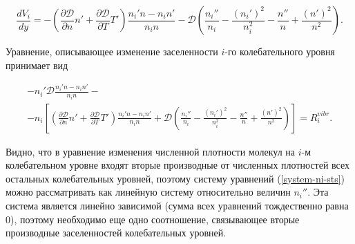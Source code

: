 \documentclass[12pt]{article}
\begin{document}
\begin{equation}
  \frac{dV_{i}}{dy} = -\left(\frac{\partial \mathcal{D}}{\partial n}n' + \frac{\partial \mathcal{D}}{\partial T}T' \right) \frac{n_{i}'n - n_{i}n'}{n_{i}n} - \mathcal{D}\left(\frac{n_{i}''}{n_{i}} - \frac{\left(n_{i}'\right)^2}{n_{i}^2} - \frac{n''}{n} + \frac{\left(n'\right)^2}{n^2} \right).
\end{equation}

Уравнение, описывающее изменение заселенности $i$-го колебательного уровня принимает вид

\begin{multline}
  -n_{i}' \mathcal{D} \frac{n_{i}'n - n_{i}n'}{n_{i}n} - \\  %
  - n_{i} \left[\left(\frac{\partial \mathcal{D}}{\partial n}n' + \frac{\partial \mathcal{D}}{\partial T}T' \right) \frac{n_{i}'n - n_{i}n'}{n_{i}n} + \mathcal{D}\left(\frac{n_{i}''}{n_{i}} - \frac{\left(n_{i}'\right)^2}{n_{i}^2} - \frac{n''}{n} + \frac{\left(n'\right)^2}{n^2} \right) \right]
  = R_{i}^{vibr}.\label{system-ni-sts}
\end{multline}

Видно, что в уравнение изменения численной плотности молекул на $i$-м колебательном уровне входят вторые производные от численных плотностей всех остальных колебательных уровней, поэтому систему уравнений (\ref{system-ni-sts}) можно рассматривать как линейную систему относительно величин $n_{i}''$. Эта система является линейно зависимой (сумма всех уравнений тождественно равна 0), поэтому необходимо еще одно соотношение, связывающее вторые производные заселенностей колебательных уровней.
% 



\end{document}
